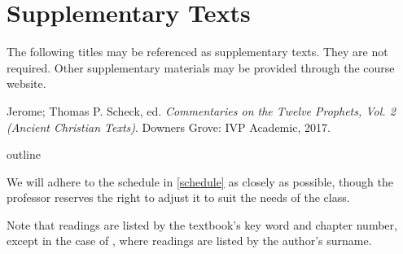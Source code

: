 \documentclass[titlepage]{article}
\begin{document}
\section{Supplementary Texts}
\label{supplementary}

The following titles may be referenced as supplementary texts. They are
not required. Other supplementary materials may be provided through the
course website.

\begingroup
\renewcommand{\section}[2]{}%
\begin{thebibliography}{3}%

	 Jerome; Thomas P. Scheck, ed.
	\emph{Commentaries on the Twelve Prophets, Vol. 2 (Ancient Christian Texts)}.
	Downers Grove: IVP Academic, 2017.

\end{thebibliography}
\endgroup

\section{Course Outline}
\label{outline}

We will adhere to the schedule in \autoref{schedule} as closely as
possible, though the professor reserves the right to adjust it to suit
the needs of the class.

Note that readings are listed by the textbook's key word and chapter
number, except in the case of \cite{Reflections}, where readings are
listed by the author's surname.
\end{document}
